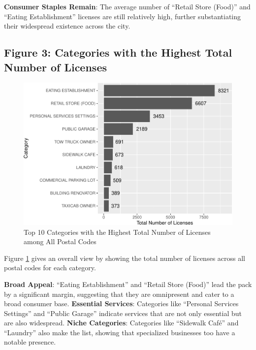 \documentclass[
]{article}
\begin{document}
\textbf{Consumer Staples Remain}: The average number of ``Retail Store (Food)'' and ``Eating Establishment'' licenses are still relatively high, further substantiating their widespread existence across the city.

\newpage

\hypertarget{figure-3-categories-with-the-highest-total-number-of-licenses}{%
\subsection{Figure 3: Categories with the Highest Total Number of Licenses}\label{figure-3-categories-with-the-highest-total-number-of-licenses}}

\begin{figure}
\centering
\includegraphics{paper_files/figure-latex/total-1.pdf}
\caption{\label{fig:total}Top 10 Categories with the Highest Total Number of Licenses
among All Postal Codes}
\end{figure}

Figure \ref{fig:total} gives an overall view by showing the total number of licenses across all postal codes for each category.

\textbf{Broad Appeal}: ``Eating Establishment'' and ``Retail Store (Food)'' lead the pack by a significant margin, suggesting that they are omnipresent and cater to a broad consumer base.
\textbf{Essential Services}: Categories like ``Personal Services Settings'' and ``Public Garage'' indicate services that are not only essential but are also widespread.
\textbf{Niche Categories}: Categories like ``Sidewalk Café'' and ``Laundry'' also make the list, showing that specialized businesses too have a notable presence.
\end{document}
